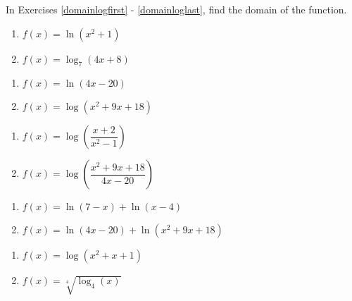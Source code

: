 In Exercises \ref{domainlogfirst} - \ref{domainloglast}, find the domain of the function.

\begin{multicols}{2}
\begin{enumerate}
\setcounter{enumi}{\value{HW}}


\item $f(x) = \ln(x^{2} + 1)$ \label{domainlogfirst}
\item $f(x) = \log_{7}(4x + 8)$

\setcounter{HW}{\value{enumi}}
\end{enumerate}
\end{multicols}

\begin{multicols}{2}
\begin{enumerate}
\setcounter{enumi}{\value{HW}}


\item $f(x) = \ln(4x-20)$
\item $f(x) = \log \left(x^2+9x+18\right)$

\setcounter{HW}{\value{enumi}}
\end{enumerate}
\end{multicols}

\begin{multicols}{2}
\begin{enumerate}
\setcounter{enumi}{\value{HW}}

\item $f(x) = \log \left(\dfrac{x + 2}{x^{2} - 1}\right)$
\item $f(x) = \log\left(\dfrac{x^2+9x+18}{4x-20}\right)$

\setcounter{HW}{\value{enumi}}
\end{enumerate}
\end{multicols}

\begin{multicols}{2}
\begin{enumerate}
\setcounter{enumi}{\value{HW}}

\item $f(x) = \ln(7 - x) + \ln(x - 4)$
\item $f(x) = \ln(4x-20) + \ln\left(x^2+9x+18\right)$

\setcounter{HW}{\value{enumi}}
\end{enumerate}
\end{multicols}

\begin{multicols}{2}
\begin{enumerate}
\setcounter{enumi}{\value{HW}}

\item $f(x) = \log\left(x^2+x+1\right)$
\item $f(x) = \sqrt[4]{\log_{4} (x)}$

\setcounter{HW}{\value{enumi}}
\end{enumerate}
\end{multicols}

